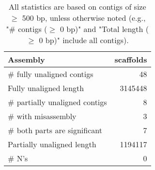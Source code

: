 \documentclass[12pt,a4paper]{article}
\begin{document}
\begin{table}[ht]
\begin{center}
\caption{All statistics are based on contigs of size $\geq$ 500 bp, unless otherwise noted (e.g., "\# contigs ($\geq$ 0 bp)" and "Total length ($\geq$ 0 bp)" include all contigs).}
\begin{tabular}{|l*{1}{|r}|}
\hline
Assembly & scaffolds \\ \hline
\# fully unaligned contigs & 48 \\ \hline
Fully unaligned length & 3145448 \\ \hline
\# partially unaligned contigs & 8 \\ \hline
\hspace{5mm}\# with misassembly & 3 \\ \hline
\hspace{5mm}\# both parts are significant & 7 \\ \hline
Partially unaligned length & 1194117 \\ \hline
\# N's & 0 \\ \hline
\end{tabular}
\end{center}
\end{table}
\end{document}
